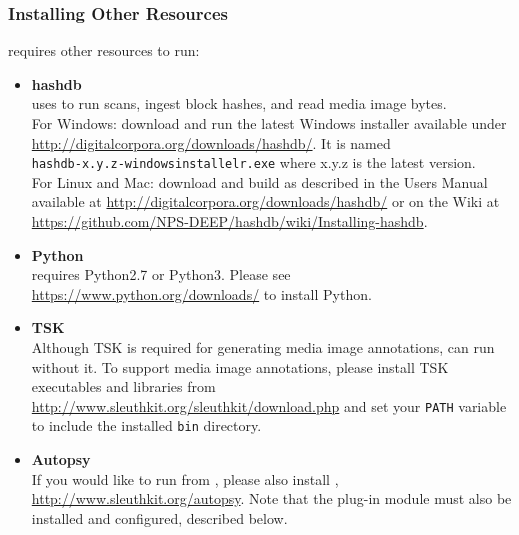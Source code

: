 \documentclass[11pt,fleqn]{article} %
\begin{document}
\subsubsection{Installing Other Resources}
\sscope requires other resources to run:
\begin{itemize}
\item \textbf{hashdb}\\
\sscope uses \hdb to run scans, ingest block hashes, and read media image bytes.\\

For Windows: download and run the latest \hdb Windows installer available under \url{http://digitalcorpora.org/downloads/hashdb/}. It is named\\
\verb+hashdb-x.y.z-windowsinstallelr.exe+ where x.y.z is the latest version.\\

For Linux and Mac: download and build \hdb as described in the \hdb Users Manual available at \url{http://digitalcorpora.org/downloads/hashdb/} or on the \hdb Wiki at \url{https://github.com/NPS-DEEP/hashdb/wiki/Installing-hashdb}.

\item \textbf{Python}\\
\sscope requires Python2.7 or Python3. Please see \url{https://www.python.org/downloads/} to install Python.
\item \textbf{TSK}\\
Although TSK is required for generating media image annotations, \sscope can run without it. To support media image annotations, please install TSK executables and libraries from \url{http://www.sleuthkit.org/sleuthkit/download.php} and set your \verb+PATH+ variable to include the installed \verb+bin+ directory.
\item \textbf{Autopsy}\\
If you would like to run \sscope from \aut, please also install \aut, \url{http://www.sleuthkit.org/autopsy}. Note that the \sscope \aut plug-in module must also be installed and configured, described below.
\end{itemize}
\end{document}
